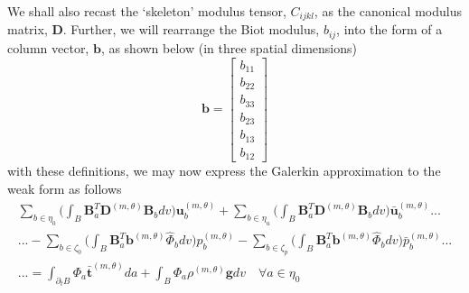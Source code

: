 \documentclass[11pt]{article} %
\begin{document}
We shall also recast the `skeleton' modulus tensor, $C_{ijkl}$, as the canonical modulus matrix, $\mathbf{D}$. Further, we will rearrange the Biot modulus, $b_{ij}$, into the form of a column vector, $\mathbf{b}$, as shown below (in three spatial dimensions)
\begin{equation}
	\mathbf{b} = \left[
	\begin{array}{c}
		b_{11} \\
		b_{22} \\
		b_{33} \\
		b_{23} \\
		b_{13} \\
		b_{12}
	\end{array} \right]
\end{equation}
with these definitions, we may now express the Galerkin approximation to the weak form as follows
\begin{eqnarray}
	 \sum_{b \in \eta_0} \bigg( \int_B \mathbf{B}_a^T \mathbf{D}^{(m,\theta)} \mathbf{B}_b dv \bigg) \mathbf{u}_b^{(m,\theta)} + \sum_{b \in \eta_u} \bigg( \int_B \mathbf{B}_a^T \mathbf{D}^{(m,\theta)} \mathbf{B}_b dv \bigg) \bar{\mathbf{u}}_b^{(m,\theta)} ... \nonumber \\
	... - \sum_{b \in \zeta_0} \bigg( \int_B \mathbf{B}_a^T \mathbf{b}^{(m,\theta)} \hat{\Phi}_b dv \bigg) p_b^{(m,\theta)} - \sum_{b \in \zeta_p} \bigg( \int_B \mathbf{B}_a^T \mathbf{b}^{(m,\theta)} \hat{\Phi}_b dv \bigg) \bar{p}_b^{(m,\theta)} ... \nonumber \\
	... = \int_{\partial_t B} \Phi_a \bar{\mathbf{t}}^{(m,\theta)} da + \int_B \Phi_a \rho^{(m,\theta)} \mathbf{g} dv \quad \forall a \in \eta_0
\end{eqnarray}
\end{document}
